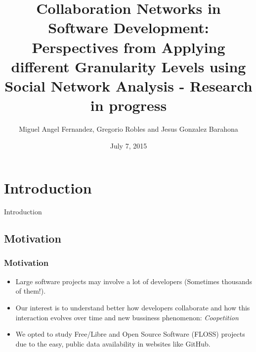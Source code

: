 \documentclass{beamer}
\title[SATToSE 2015]{Collaboration Networks in Software Development: Perspectives from Applying different Granularity Levels using Social Network Analysis - Research in progress} %
\author{Miguel Angel Fernandez, Gregorio Robles and Jesus Gonzalez Barahona} %
\institute[UCLA] %
{
GSyC/LibreSoft, Rey Juan Carlos University \\ %
\medskip
\textit{(ma.fernandezsa@alumnos, grex@)urjc.es; jgb@bitergia.com} %
}
\date{July 7, 2015} %
\begin{document}
\begin{frame}
\titlepage %
\end{frame}


\section{Introduction} %

\begin{frame}
\Huge{\centerline{Introduction}}
\end{frame}

\subsection{Motivation} %

\begin{frame}
\frametitle{Motivation}
\begin{itemize}
\item Large software projects may involve a lot of developers (Sometimes thousands of them!).
\item Our interest is to understand better how developers collaborate and how this interaction evolves over time and new bussiness phenomenon: \textit{Coopetition}
\item We opted to study Free/Libre and Open Source Software (FLOSS) projects due to the easy, public data availability in websites like GitHub.

\end{itemize}
\end{frame}

\end{document}
